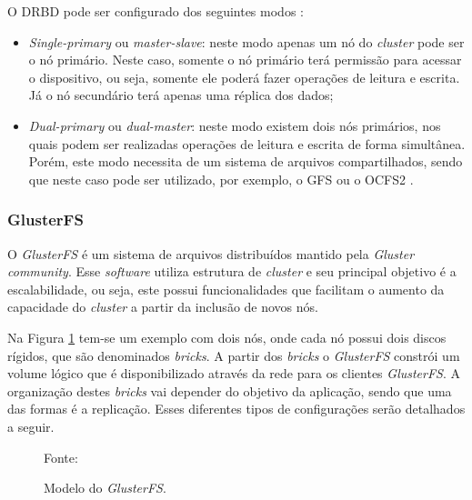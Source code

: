 O \ac{DRBD} pode ser configurado dos seguintes modos \cite{drbd}:
\begin{itemize}
 \item \textit{Single-primary} ou \textit{master-slave}: neste modo apenas um nó do \textit{cluster} pode ser o nó primário. Neste caso, somente
 o nó primário terá permissão para acessar o dispositivo, ou seja, somente ele poderá fazer operações de leitura e escrita. Já o nó 
 secundário terá apenas uma réplica dos dados;
 \item \textit{Dual-primary} ou \textit{dual-master}: neste modo existem dois nós primários, nos quais podem ser realizadas operações de leitura e 
 escrita de forma simultânea. Porém, este modo necessita de um sistema de arquivos compartilhados, sendo que neste caso pode ser utilizado, por
 exemplo, o \ac{GFS} \cite{gfs} ou o \ac{OCFS2} \cite{ocfs2}.
\end{itemize}

\subsubsection{GlusterFS}
\label{section:glusterfs}
O \textit{GlusterFS} \cite{glusterfs} é um sistema de arquivos distribuídos mantido pela \textit{Gluster community}. Esse \textit{software} 
utiliza estrutura de \textit{cluster} e seu principal objetivo é a escalabilidade, ou seja, este possui funcionalidades que facilitam o aumento
da capacidade do \textit{cluster} a partir da inclusão de novos nós.

Na Figura \ref{fig:glusterfs} tem-se um exemplo com dois nós, onde cada nó possui dois discos rígidos, que são denominados \textit{bricks}. 
A partir dos \textit{bricks} o \textit{GlusterFS} constrói um volume lógico que é disponibilizado através da rede para os clientes 
\textit{GlusterFS}. A organização destes \textit{bricks} vai depender do objetivo da aplicação, sendo que uma das formas é a replicação. Esses 
diferentes tipos de configurações serão detalhados a seguir.

\begin{figure}[h!]
 \centering
 \caption{Modelo do \textit{GlusterFS}.}
 Fonte: \citet{davies2013}
 \label{fig:glusterfs}
\end{figure}

